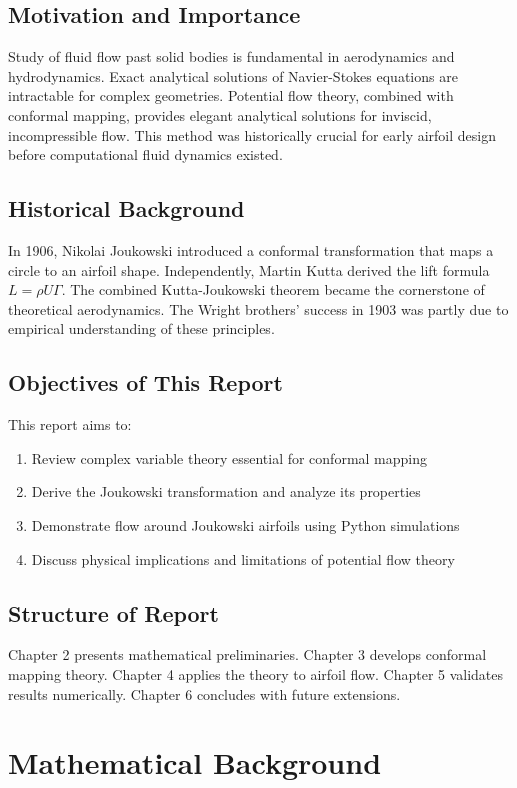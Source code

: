 \documentclass[12pt,a4paper]{article}
\begin{document}
\subsection{Motivation and Importance}
Study of fluid flow past solid bodies is fundamental in aerodynamics and hydrodynamics.
Exact analytical solutions of Navier-Stokes equations are intractable for complex geometries.
Potential flow theory, combined with conformal mapping, provides elegant analytical solutions
for inviscid, incompressible flow. This method was historically crucial for early airfoil
design before computational fluid dynamics existed.

\subsection{Historical Background}
In 1906, Nikolai Joukowski introduced a conformal transformation that maps a circle to
an airfoil shape. Independently, Martin Kutta derived the lift formula $L = \rho U \Gamma$.
The combined Kutta-Joukowski theorem became the cornerstone of theoretical aerodynamics.
The Wright brothers' success in 1903 was partly due to empirical understanding of these principles.

\subsection{Objectives of This Report}
This report aims to:
\begin{enumerate}
    \item Review complex variable theory essential for conformal mapping
    \item Derive the Joukowski transformation and analyze its properties
    \item Demonstrate flow around Joukowski airfoils using Python simulations
    \item Discuss physical implications and limitations of potential flow theory
\end{enumerate}

\subsection{Structure of Report}
Chapter 2 presents mathematical preliminaries. Chapter 3 develops conformal mapping theory.
Chapter 4 applies the theory to airfoil flow. Chapter 5 validates results numerically.
Chapter 6 concludes with future extensions.
\section{Mathematical Background}
\end{document}

